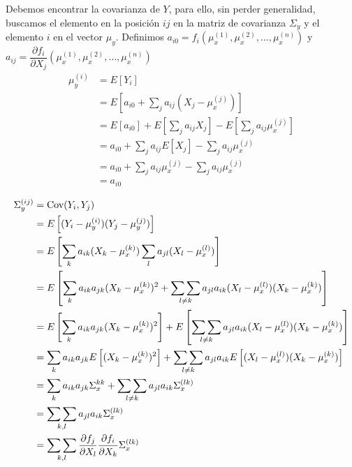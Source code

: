 \documentclass[a4paper, 10pt]{article}
\begin{document}
Debemos encontrar la covarianza de $Y$, para ello, sin perder generalidad, buscamos el elemento
en la posición $ij$ en la matriz de covarianza $\Sigma_y$ y el elemento $i$ en el vector $\mu_y$.
Definimos $a_{i0} = f_i(\mu_x^{(1)}, \mu_x^{(2)},\dots,\mu_x^{(n)})$ y $a_{ij} = \dfrac{\partial f_i}{\partial X_j}(\mu_x^{(1)}, \mu_x^{(2)}, \dots,\mu_x^{(n)})$
\begin{equation}
    \begin{split}
        \mu_y^{(i)} &= E\left[Y_i\right] \\
        &=E\left[a_{i0} + \sum_{j}{a_{ij}(X_j-\mu_x^{(j)})}\right] \\
        &=E\left[a_{i0}\right] + E\left[\sum_{j}{a_{ij}X_j}\right] - E\left[\sum_{j}{a_{ij}\mu_x^{(j)}}\right] \\
        &=a_{i0} + \sum_{j}a_{ij}E\left[{X_j}\right] - \sum_{j}a_{ij}\mu_x^{(j)} \\
        &=a_{i0} + \sum_{j}a_{ij}\mu_x^{(j)} - \sum_{j}a_{ij}\mu_x^{(j)} \\
        &=a_{i0} \\
    \end{split}
\end{equation}
\begin{equation}
    \begin{split}
        \Sigma_y^{(ij)} &= \textnormal{Cov}(Y_i, Y_j) \\
        &=E\left[(Y_i-\mu_y^{(i)})(Y_j-\mu_y^{(j)})\right] \\
        &=E\left[\sum_{k}{a_{ik}(X_k-\mu_x^{(k)})}\sum_{l}{a_{jl}(X_l-\mu_x^{(l)})}\right] \\
        &=E\left[\sum_{k}{a_{ik}a_{jk}(X_k-\mu_x^{(k)})^{2}} + \mathop{\sum\sum}_{l\neq k}{a_{jl}a_{ik}(X_l-\mu_x^{(l)})(X_k-\mu_x^{(k)})}\right] \\
        &=E\left[\sum_{k}{a_{ik}a_{jk}(X_k-\mu_x^{(k)})^{2}}\right]+E\left[\mathop{\sum\sum}_{l\neq k}{a_{jl}a_{ik}(X_l-\mu_x^{(l)})(X_k-\mu_x^{(k)})}\right] \\
        &=\sum_{k}a_{ik}a_{jk}E\left[{(X_k-\mu_x^{(k)})^{2}}\right]+\mathop{\sum\sum}_{l\neq k}a_{jl}a_{ik}E\left[{(X_l-\mu_x^{(l)})(X_k-\mu_x^{(k)})}\right] \\
        &=\sum_{k}a_{ik}a_{jk}\Sigma_x^{kk}+\mathop{\sum\sum}_{l\neq k}a_{jl}a_{ik}\Sigma_x^{(lk)} \\
        &=\mathop{\sum\sum}_{k,l}{a_{jl}a_{ik}\Sigma_x^{(lk)}} \\
        &=\mathop{\sum\sum}_{k,l}{\dfrac{\partial f_j}{\partial X_l} \dfrac{\partial f_i}{\partial X_k}\Sigma_x^{(lk)}}
    \end{split}
\end{equation}
\end{document}
